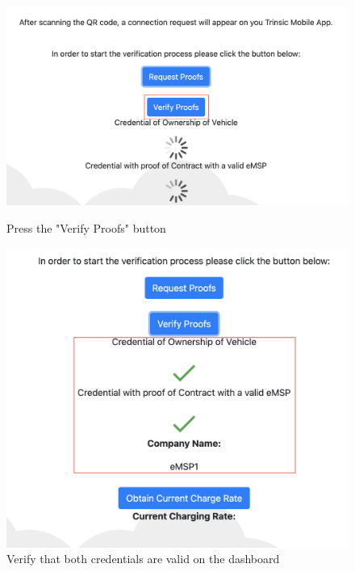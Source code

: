 \begin{figure}[H]
\centering
\begin{minipage}{.5\textwidth}
  \centering
  \includegraphics[width=.9\linewidth]{images/Frontend/Charging/4.png}
  \caption[]{Press the "Verify Proofs" button}
  \label{fig:charging_screenshot_4}
\end{minipage}%
\begin{minipage}{.5\textwidth}
  \centering
  \includegraphics[width=.9\linewidth]{images/Frontend/Charging/5.png}
  \caption[]{Verify that both credentials are valid on the dashboard}
  \label{fig:charging_screenshot_5}
\end{minipage}
\end{figure}

